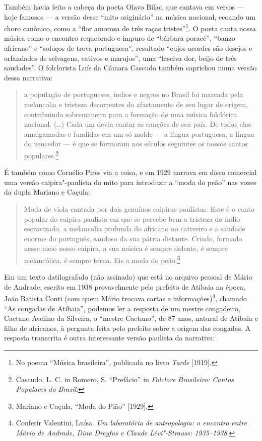 Também havia feito a cabeça do poeta Olavo Bilac, que cantava em versos
--- hoje famosos --- a versão desse ``mito originário'' na música
nacional, ecoando um choro canônico, como a ``flor amorosa de três raças
tristes''\footnote{No poema ``Música brasileira'', publicada no livro
  \emph{Tarde} {[}1919{]}.}. O poeta canta nossa música como o encontro
requebrado e impuro de ``bárbara poracé'', ``banzo africano'' e
``soluços de trova portuguesa'', resultado ``cujos acordes são desejos e
orfandades de selvagens, cativos e marujos'', uma ``lasciva dor, beijo
de três saudades''. O folclorista Luís da Câmara Cascudo também
caprichou numa versão dessa narrativa:

\begin{quote}
a população de portugueses, índios e negros no Brasil foi marcada pela
melancolia e tristeza decorrentes do afastamento de seu lugar de origem,
contribuindo sobremaneira para a formação de uma música folclórica
nacional. (\ldots{}) Cada um devia cantar as canções de seu país. De todas
elas amalgamadas e fundidas em um só molde --- a língua portuguesa, a
língua do vencedor --- é que se formaram nos séculos seguintes os nossos
cantos populares.\footnote{Cascudo, L. C. in Romero, S. ``Prefácio'' in
  \emph{Folclore Brasileiro: Cantos Populares do Brasil}.}
\end{quote}

É também como Cornélio Pires via a coisa, e em 1929 narrava em disco
comercial uma versão caipira"-paulista do mito para introduzir a ``moda
do peão'' nas vozes da dupla Mariano e Caçula:

\begin{quote}
Moda de viola cantada por dois genuínos caipiras paulistas. Este é o
canto popular do caipira paulista em que se percebe bem a tristeza do
índio escravizado, a melancolia profunda do africano no cativeiro e a
saudade enorme do português, saudoso da sua pátria distante. Criado,
formado nesse meio nosso caipira, a sua música é sempre dolente, é
sempre melancólica, é sempre terna. Eis a moda do peão.\footnote{Mariano
  e Caçula, ``Moda do Pião'' {[}1929{]}.}
\end{quote}

Em um texto datilografado (não assinado) que está no arquivo pessoal de
Mário de Andrade, escrito em 1938 provavelmente pelo prefeito de Atibaia
na época, João Batista Conti (com quem Mário trocava cartas e
informações)\footnote{Conferir Valentini, Luísa. \emph{Um laboratório de
  antropologia: o encontro entre Mário de Andrade, Dina Dreyfus e Claude
  Lévi"-Strauss: 1935--1938}.}, chamado ``As congadas de Atibaia'',
podemos ler a resposta de um mestre congadeiro, Caetano Avelino da
Silveira, o ``mestre Caetano'', de 87 anos, natural de Atibaia e filho
de africanos, à pergunta feita pelo prefeito sobre a origem das
congadas. A resposta transcrita é outra interessante versão paulista da
narrativa:

